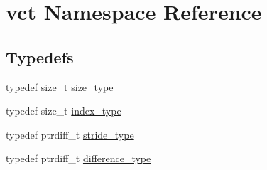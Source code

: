 \hypertarget{namespacevct}{\section{vct Namespace Reference}
\label{namespacevct}
}
\subsection*{Typedefs}
\begin{DoxyCompactItemize}
\item 
typedef size\-\_\-t \hyperlink{namespacevct_a3e2935e13aac4500965e00d30565775b}{size\-\_\-type}
\item 
typedef size\-\_\-t \hyperlink{namespacevct_a50405d87494dce1f22ee3930ca285ee9}{index\-\_\-type}
\item 
typedef ptrdiff\-\_\-t \hyperlink{namespacevct_ababd20afe3b060aa77ea229b0226c154}{stride\-\_\-type}
\item 
typedef ptrdiff\-\_\-t \hyperlink{namespacevct_a1c68f426f63d011adc3563911c76550c}{difference\-\_\-type}
\end{DoxyCompactItemize}


